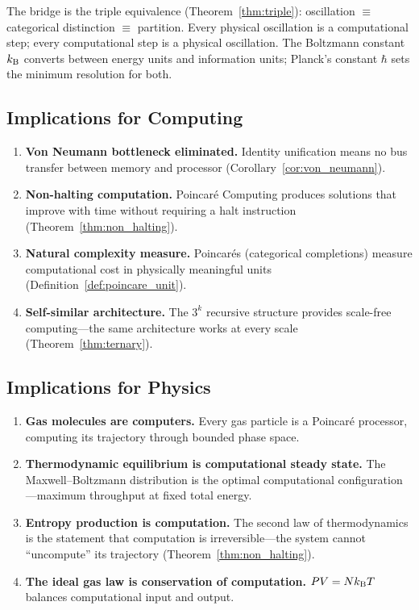 The bridge is the triple equivalence (Theorem~\ref{thm:triple}): oscillation $\equiv$ categorical distinction $\equiv$ partition. Every physical oscillation is a computational step; every computational step is a physical oscillation. The Boltzmann constant $k_{\mathrm{B}}$ converts between energy units and information units; Planck's constant $\hbar$ sets the minimum resolution for both.

\subsection{Implications for Computing}

\begin{enumerate}
    \item \textbf{Von Neumann bottleneck eliminated.} Identity unification means no bus transfer between memory and processor (Corollary~\ref{cor:von_neumann}).
    \item \textbf{Non-halting computation.} Poincar\'{e} Computing produces solutions that improve with time without requiring a halt instruction (Theorem~\ref{thm:non_halting}).
    \item \textbf{Natural complexity measure.} Poincar\'{e}s (categorical completions) measure computational cost in physically meaningful units (Definition~\ref{def:poincare_unit}).
    \item \textbf{Self-similar architecture.} The $3^k$ recursive structure provides scale-free computing---the same architecture works at every scale (Theorem~\ref{thm:ternary}).
\end{enumerate}

\subsection{Implications for Physics}

\begin{enumerate}
    \item \textbf{Gas molecules are computers.} Every gas particle is a Poincar\'{e} processor, computing its trajectory through bounded phase space.
    \item \textbf{Thermodynamic equilibrium is computational steady state.} The Maxwell--Boltzmann distribution is the optimal computational configuration---maximum throughput at fixed total energy.
    \item \textbf{Entropy production is computation.} The second law of thermodynamics is the statement that computation is irreversible---the system cannot ``uncompute'' its trajectory (Theorem~\ref{thm:non_halting}).
    \item \textbf{The ideal gas law is conservation of computation.} $PV = Nk_{\mathrm{B}} T$ balances computational input and output.
\end{enumerate}

